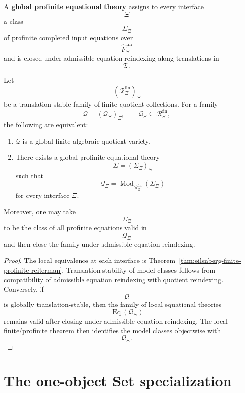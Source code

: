 \begin{definition}
\label{def:eilenberg-global-profinite-equational-theory}
A \textbf{global profinite equational theory} assigns to every interface
\[
\Xi
\]
a class
\[
\Sigma_\Xi
\]
of profinite completed input equations over
\[
\widehat F_\Xi^{\,\mathrm{fin}}
\]
and is closed under admissible equation reindexing along translations in
\[
\mathfrak T.
\]
\end{definition}

\begin{theorem}
\label{thm:eilenberg-global-finite-profinite-reiterman}
Let
\[
(\mathcal R_\Xi^{\mathrm{fin}})_\Xi
\]
be a translation-stable family of finite quotient collections. For a family
\[
\mathcal Q=(\mathcal Q_\Xi)_\Xi,
\qquad
\mathcal Q_\Xi\subseteq\mathcal R_\Xi^{\mathrm{fin}},
\]
the following are equivalent:
\begin{enumerate}
\item \(\mathcal Q\) is a global finite algebraic quotient variety.
\item There exists a global profinite equational theory
\[
\Sigma=(\Sigma_\Xi)_\Xi
\]
such that
\[
\mathcal Q_\Xi
=
\operatorname{Mod}_{\mathcal R_\Xi^{\mathrm{fin}}}(\Sigma_\Xi)
\]
for every interface \(\Xi\).
\end{enumerate}
Moreover, one may take
\[
\Sigma_\Xi
\]
to be the class of all profinite equations valid in
\[
\mathcal Q_\Xi
\]
and then close the family under admissible equation reindexing.
\end{theorem}

\begin{proof}
The local equivalence at each interface is
Theorem~\ref{thm:eilenberg-finite-profinite-reiterman}. Translation stability
of model classes follows from compatibility of admissible equation
reindexing with quotient reindexing. Conversely, if
\[
\mathcal Q
\]
is globally translation-stable, then the family of local equational theories
\[
\operatorname{Eq}(\mathcal Q_\Xi)
\]
remains valid after closing under admissible equation reindexing. The local
finite/profinite theorem then identifies the model classes objectwise with
\[
\mathcal Q_\Xi.
\]
\end{proof}

\section{The one-object Set specialization}
\label{sec:eilenberg-one-object-set}

